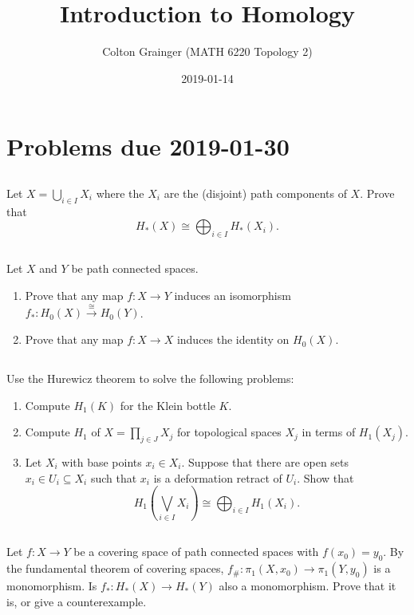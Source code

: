 \documentclass[11pt]{amsart}
\title{Introduction to Homology}
\author{Colton Grainger (MATH 6220 Topology 2)}
\date{2019-01-14}
\let\subsubsection\subsection
\let\subsection\section
\let\section\chapter
\let\chapter\part
\begin{document}
\maketitle

\subsection{Problems due 2019-01-30}

\subsubsection{}

Let \(X = \bigcup_{i\in I} X_i\) where the \(X_i\) are the (disjoint)
path components of \(X\). Prove that
\[H_*(X) \cong \bigoplus_{i\in I} H_*(X_i).\]

\subsubsection{}

Let \(X\) and \(Y\) be path connected spaces.

\begin{enumerate}
\def\labelenumi{(\alph{enumi})}
\item
  Prove that any map \(f \colon X \to Y\) induces an isomorphism
  \(f_* \colon H_0(X) \xrightarrow{\cong} H_0(Y)\).
\item
  Prove that any map \(f \colon X \to X\) induces the identity on
  \(H_0(X)\).
\end{enumerate}

\subsubsection{}

Use the Hurewicz theorem to solve the following problems:

\begin{enumerate}
\def\labelenumi{(\alph{enumi})}
\item
  Compute \(H_1(K)\) for the Klein bottle \(K\).
\item
  Compute \(H_1\) of \(X=\prod_{j \in J} X_j\) for topological spaces
  \(X_j\) in terms of \(H_1(X_j)\).
\item
  Let \(X_i\) with base points \(x_i \in X_i\). Suppose that there are
  open sets \(x_i\in U_i \subseteq X_i\) such that \(x_i\) is a
  deformation retract of \(U_i\). Show that
  \[{H}_1 \left( \bigvee_{i\in I}  X_i \right)  \cong \bigoplus_{i\in I} {H}_1(X_i).\]
\end{enumerate}

\subsubsection{}

Let \(f \colon X \to Y\) be a covering space of path connected spaces
with \(f(x_0) = y_0\). By the fundamental theorem of covering spaces,
\(f_{\#} \colon \pi_1(X,x_0) \to \pi_1(Y, y_0)\) is a monomorphism. Is
\(f_* \colon H_*(X) \to H_*(Y)\) also a monomorphism. Prove that it is,
or give a counterexample.
\end{document}
